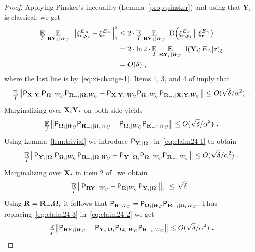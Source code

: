 \begin{proof}

Applying Pinsker's inequality (Lemma~\ref{prop:pinsker}) and using that $\mathbf{Y}_i$ is classical, we get
\begin{align}
\operatorname*{\mathbb{E}}_I \, \operatorname*{\mathbb{E}}_{\mathbf{R} \mathbf{Y}_i | W_C} \,\, \big \| \xi^{E_A}_{\mathbf{r},\mathbf{y}_i} -  \xi^{E_A}_{\mathbf{r}} \Big \|_1^2 &\leq 2 \cdot \operatorname*{\mathbb{E}}_I \,\operatorname*{\mathbb{E}}_{\mathbf{R} \mathbf{Y}_i | W_C} \,\,  \mathrm{D} \Big(  \xi^{E_A}_{\mathbf{r},\mathbf{y}_i} \, \big \|\, \xi^{E_B}_{\mathbf{r}} \big )\notag\\
&= 2\cdot \ln 2\cdot \operatorname*{\mathbb{E}}_I \, \operatorname*{\mathbb{E}}_{\mathbf{R} \mathbf{Y}_i | W_C} \,\,  \mathrm{I} (\mathbf{Y}_i ; E_A | \mathbf{r})_\xi \notag\\
& = O(\delta)~,\label{eq:claim24-1a}
\end{align} 
where the last line is by~\eqref{eq:xi-change-1}. Items 1, 3, and 4 of  imply that 
\[
\operatorname*{\mathbb{E}}_I \left \|  \mathsf{P}_{\mathbf{X}_i \mathbf{Y}_i} \mathsf{P}_{{\boldsymbol{\Omega}}_i | W_C} \mathsf{P}_{\mathbf{R}_{-i} | {\boldsymbol{\Omega}}_i  W_C} - \mathsf{P}_{\mathbf{X}_i \mathbf{Y}_i | W_C}  \mathsf{P}_{{\boldsymbol{\Omega}}_i | W_C} \mathsf{P}_{\mathbf{R}_{-i} | \mathbf{X}_i \mathbf{Y}_i  W_C} \right \| \leq O(\sqrt{\delta}/\alpha^2)~.
\]
Marginalizing over $\mathbf{X}_i \mathbf{Y}_i$ on both side yields
\begin{equation}\label{eq:claim24-1}
\operatorname*{\mathbb{E}}_I \left \| \mathsf{P}_{{\boldsymbol{\Omega}}_i | W_C} \mathsf{P}_{\mathbf{R}_{-i} | {\boldsymbol{\Omega}}_i  W_C} -  \mathsf{P}_{{\boldsymbol{\Omega}}_i | W_C} \mathsf{P}_{\mathbf{R}_{-i} | W_C} \right \| \leq O(\sqrt{\delta}/\alpha^2)~.
\end{equation}
Using Lemma~\ref{lem:trivial} we introduce $\mathsf{P}_{\mathbf{Y}_i | {\boldsymbol{\Omega}}_i }$ in~\eqref{eq:claim24-1} to obtain 
\begin{equation}\label{eq:claim24-2}
\operatorname*{\mathbb{E}}_I \left \| \mathsf{P}_{\mathbf{Y}_i | {\boldsymbol{\Omega}}_i }\mathsf{P}_{{\boldsymbol{\Omega}}_i | W_C} \mathsf{P}_{\mathbf{R}_{-i} | {\boldsymbol{\Omega}}_i  W_C} - \mathsf{P}_{\mathbf{Y}_i | {\boldsymbol{\Omega}}_i } \mathsf{P}_{{\boldsymbol{\Omega}}_i | W_C} \mathsf{P}_{\mathbf{R}_{-i} | W_C} \right \| \leq O(\sqrt{\delta}/\alpha^2)~.
\end{equation}
Marginalizing over $\mathbf{X}_i$ in item 2 of~ we obtain
\begin{equation}\label{eq:claim24-3}
\operatorname*{\mathbb{E}}_{I} \big\|\mathsf{P}_{\mathbf{R} \mathbf{Y}_i | W_C} - \mathsf{P}_{\mathbf{R} | W_C} \mathsf{P}_{\mathbf{Y}_i | {\boldsymbol{\Omega}}_i }\big\|_1 \,\leq\,\sqrt{\delta}\;.
\end{equation}
Using $\mathbf{R} = \mathbf{R}_{-i}{\boldsymbol{\Omega}}_i$ it follows that $\mathsf{P}_{\mathbf{R} | W_C}=\mathsf{P}_{{\boldsymbol{\Omega}}_i | W_C} \mathsf{P}_{\mathbf{R}_{-i} | {\boldsymbol{\Omega}}_i  W_C}$. Thus replacing~\eqref{eq:claim24-3} in~\eqref{eq:claim24-2} we get
\begin{equation}\label{eq:claim24-4}
\Ex_I \left \| \P_{\bR \bY_i | W_C} - \P_{\bY_i | \bOmega_i } \P_{\bOmega_i | W_C} \P_{\bR_\mi | W_C} \right \| \leq O(\sqrt{\delta}/\alpha^2)~.

\end{equation}
\end{proof}
